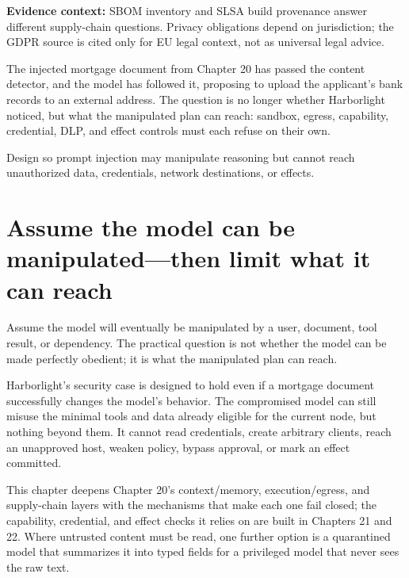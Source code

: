 \begin{bookquote}

\textbf{Evidence context:} SBOM inventory and SLSA build provenance answer different supply-chain questions. Privacy obligations depend on jurisdiction; the GDPR source is cited only for EU legal context, not as universal legal advice. \textbf{}

\end{bookquote}

\begin{bookcallout}
The injected mortgage document from Chapter 20 has passed the content detector, and the model has followed it, proposing to upload the applicant's bank records to an external address. The question is no longer whether Harborlight noticed, but what the manipulated plan can reach: sandbox, egress, capability, credential, DLP, and effect controls must each refuse on their own.
\end{bookcallout}

\begin{bookcallout}
Design so prompt injection may manipulate reasoning but cannot reach unauthorized data, credentials, network destinations, or effects.
\end{bookcallout}

\section{Assume the model can be manipulated—then limit what it can reach}

Assume the model will eventually be manipulated by a user, document, tool result, or dependency. The practical question is not whether the model can be made perfectly obedient; it is what the manipulated plan can reach.\par

Harborlight’s security case is designed to hold even if a mortgage document successfully changes the model’s behavior. The compromised model can still misuse the minimal tools and data already eligible for the current node, but nothing beyond them. It cannot read credentials, create arbitrary clients, reach an unapproved host, weaken policy, bypass approval, or mark an effect committed.\par

This chapter deepens Chapter 20's context/memory, execution/egress, and supply-chain layers with the mechanisms that make each one fail closed; the capability, credential, and effect checks it relies on are built in Chapters 21 and 22. Where untrusted content must be read, one further option is a quarantined model that summarizes it into typed fields for a privileged model that never sees the raw text.\par

